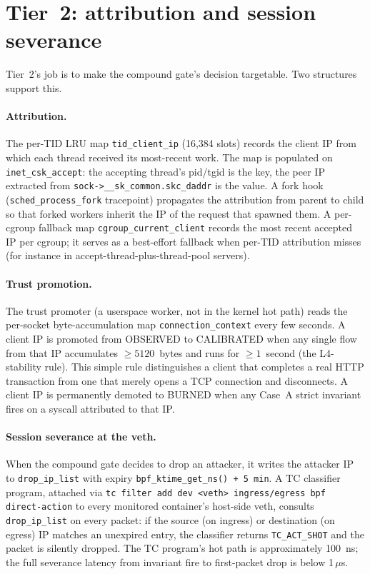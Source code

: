 \section{Tier~2: attribution and session severance}
\label{sec:tier2}

Tier~2's job is to make the compound gate's decision targetable. Two
structures support this.

\paragraph{Attribution.} The per-TID LRU map \texttt{tid\_client\_ip} (16,384
slots) records the client IP from which each thread received its
most-recent work. The map is populated on \texttt{inet\_csk\_accept}:
the accepting thread's pid/tgid is the key, the peer IP extracted from
\texttt{sock->\_\_sk\_common.skc\_daddr} is the value. A fork hook
(\texttt{sched\_process\_fork} tracepoint) propagates the attribution from
parent to child so that forked workers inherit the IP of the request that
spawned them. A per-cgroup fallback map \texttt{cgroup\_current\_client}
records the most recent accepted IP per cgroup; it serves as a
best-effort fallback when per-TID attribution misses (for instance in
accept-thread-plus-thread-pool servers).

\paragraph{Trust promotion.} The trust promoter (a userspace worker, not
in the kernel hot path) reads the per-socket byte-accumulation map
\texttt{connection\_context} every few seconds. A client IP is promoted
from OBSERVED to CALIBRATED when any single flow from that IP accumulates
$\geq 5120$~bytes and runs for $\geq 1$~second (the L4-stability rule).
This simple rule distinguishes a client that completes a real HTTP
transaction from one that merely opens a TCP connection and disconnects.
A client IP is permanently demoted to BURNED when any Case~A strict
invariant fires on a syscall attributed to that IP.

\paragraph{Session severance at the veth.} When the compound gate decides
to drop an attacker, it writes the attacker IP to \texttt{drop\_ip\_list}
with expiry \texttt{bpf\_ktime\_get\_ns()\,+\,5 min}. A TC classifier
program, attached via \texttt{tc filter add dev <veth> ingress/egress bpf
direct-action} to every monitored container's host-side veth, consults
\texttt{drop\_ip\_list} on every packet: if the source (on ingress) or
destination (on egress) IP matches an unexpired entry, the classifier
returns \texttt{TC\_ACT\_SHOT} and the packet is silently dropped. The
TC program's hot path is approximately 100~ns; the full severance latency
from invariant fire to first-packet drop is below 1\,$\mu$s.

